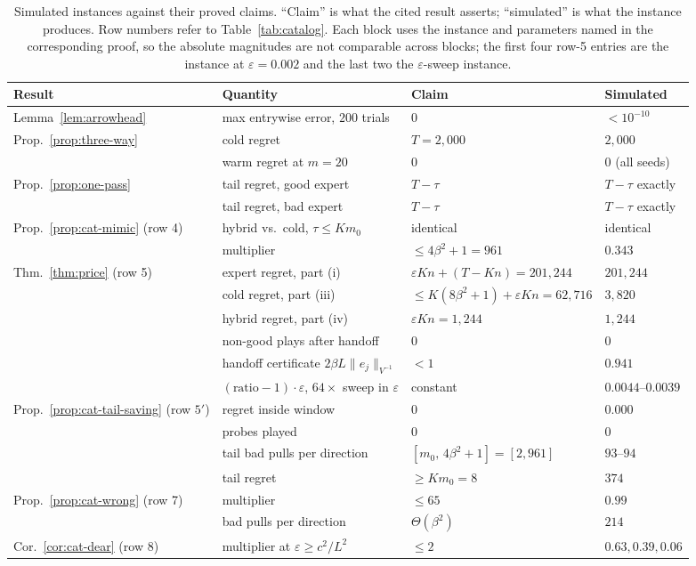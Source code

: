 \documentclass{article}
\theoremstyle{definition}
\theoremstyle{remark}
\newcommand{\eps}{\varepsilon}
\theoremstyle{remark}
\begin{document}
\begin{table}[h]
\centering
\caption{Simulated instances against their proved claims. ``Claim'' is what
the cited result asserts; ``simulated'' is what the instance produces. Row
numbers refer to Table~\ref{tab:catalog}. Each block uses the instance and
parameters named in the corresponding proof, so the absolute magnitudes are
not comparable across blocks; the first four row-5 entries are the instance at
$\eps=0.002$ and the last two the $\eps$-sweep instance.}
\label{tab:synthetic}
\small
\setlength{\tabcolsep}{4pt}
\begin{tabular}{@{}llll@{}}
\toprule
Result & Quantity & Claim & Simulated \\
\midrule
Lemma~\ref{lem:arrowhead} & max entrywise error, $200$ trials & $0$ & $<10^{-10}$ \\
\midrule
Prop.~\ref{prop:three-way} & cold regret & $T=2{,}000$ & $2{,}000$ \\
 & warm regret at $m=20$ & $0$ & $0$ (all seeds) \\
Prop.~\ref{prop:one-pass} & tail regret, good expert & $T-\tau$ & $T-\tau$ exactly \\
 & tail regret, bad expert & $T-\tau$ & $T-\tau$ exactly \\
\midrule
Prop.~\ref{prop:cat-mimic} (row 4) & hybrid vs.\ cold, $\tau\le Km_0$ & identical & identical \\
 & multiplier & $\le4\beta^2+1=961$ & $0.343$ \\
\midrule
Thm.~\ref{thm:price} (row 5) & expert regret, part (i) & $\eps Kn+(T{-}Kn)=201{,}244$ & $201{,}244$ \\
 & cold regret, part (iii) & $\le K(8\beta^2{+}1)+\eps Kn=62{,}716$ & $3{,}820$ \\
 & hybrid regret, part (iv) & $\eps Kn=1{,}244$ & $1{,}244$ \\
 & non-good plays after handoff & $0$ & $0$ \\
 & handoff certificate $2\beta L\|e_j\|_{V^{-1}}$ & $<1$ & $0.941$ \\
 & $(\text{ratio}-1)\cdot\eps$, $64\times$ sweep in $\eps$ & constant & $0.0044$--$0.0039$ \\
\midrule
Prop.~\ref{prop:cat-tail-saving} (row $5'$) & regret inside window & $0$ & $0.000$ \\
 & probes played & $0$ & $0$ \\
 & tail bad pulls per direction & $[m_0,\,4\beta^2{+}1]=[2,961]$ & $93$--$94$ \\
 & tail regret & $\ge Km_0=8$ & $374$ \\
\midrule
Prop.~\ref{prop:cat-wrong} (row 7) & multiplier & $\le65$ & $0.99$ \\
 & bad pulls per direction & $\Theta(\beta^2)$ & $214$ \\
\midrule
Cor.~\ref{cor:cat-dear} (row 8) & multiplier at $\eps\ge c^2/L^2$ & $\le2$ & $0.63,0.39,0.06$ \\
\bottomrule
\end{tabular}
\end{table}
\end{document}
